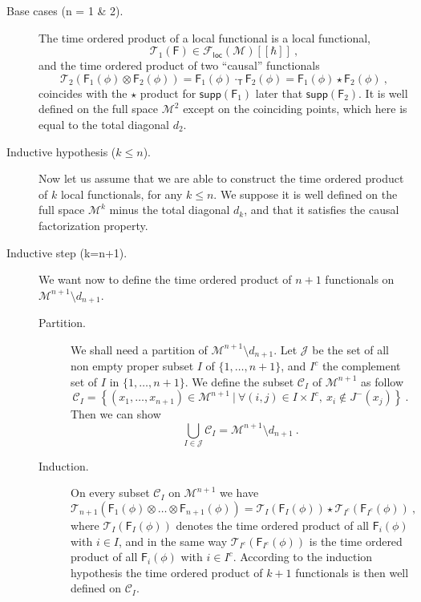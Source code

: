 \documentclass[11pt]{book}
\newcommand{\supp}{\mathsf{supp}}
\newcommand{\loc}{\mathsf{loc}}
\newcommand{\Ccal}{\mathcal{C}}
\newcommand{\Fcal}{\mathcal{F}}
\newcommand{\Jcal}{\mathcal{J}}
\newcommand{\Mcal}{\mathcal{M}}
\newcommand{\Tcal}{\mathcal{T}}
\newcommand{\Fsf}{\mathsf{F}}
\newcommand{\Tsf}{\mathsf{T}}
\theoremstyle{break}
\begin{document}
\begin{description}


\item[Base cases (n = 1 \& 2).] The time ordered product of a local functional is a local functional,
\begin{equation*}
\Tcal_1(\Fsf) \in \Fcal_\loc(\Mcal)[[\hbar]] \ , 
\end{equation*}
%
and the time ordered product of two ``causal'' functionals 
%
\begin{equation*}
\Tcal_2\left(\Fsf_1(\phi)\otimes\Fsf_2(\phi)\right) = \Fsf_1(\phi) \cdot_\Tsf \Fsf_2(\phi) = \Fsf_1(\phi) \star \Fsf_2(\phi) \ ,
\end{equation*}
%
coincides with the $\star$ product for $\supp(\Fsf_1)$ later that $\supp(\Fsf_2)$. It is well defined on the full space $\Mcal^2$ except on the coinciding points, which here is equal to the total diagonal $d_2$.


\item[Inductive hypothesis ($k\leq n$).] Now let us assume that we are able to construct the time ordered product of $k$ local functionals, for any $k \leq n$. We suppose it is well defined on the full space $\Mcal^k$ minus the total diagonal $d_k$, and that it satisfies the causal factorization property. 


\item[Inductive step (k=n+1).] We want now to define the time ordered product of $n+1$ functionals on $\Mcal^{n+1}\setminus d_{n+1}$.


\begin{description}


\item[Partition.] We shall need a partition of $\Mcal^{n+1}\setminus d_{n+1}$. Let $\Jcal$ be the set of all non empty proper subset $I$ of $\{1,\dots,n+1\}$, and $I^c$ the complement set of $I$ in $\{1,\dots,n+1\}$. We define the subset $\Ccal_I$ of $\Mcal^{n+1}$ as follow
%
\begin{equation*}
\Ccal_I = \left\{ (x_1,\dots,x_{n+1}) \in \Mcal^{n+1} \ | \ \forall (i,j) \in I \times I^c , \ x_i \notin J^-(x_j) \right\} \ .
\end{equation*}
%
Then we can show \cite[lemma 4.1]{brunetti_microlocal_2000}
%
\begin{equation*}
\bigcup_{I \in \Jcal} \Ccal_I = \Mcal^{n+1} \setminus d_{n+1} \ .
\end{equation*}


\item[Induction.] On every subset $\Ccal_I$ on $\Mcal^{n+1}$ we have 
%
\begin{equation*}
\Tcal_{n+1}\left(\Fsf_1(\phi) \otimes \dots \otimes \Fsf_{n+1}(\phi) \right) = \Tcal_{I}\left(\Fsf_I(\phi)\right) \star \Tcal_{I^c}\left(\Fsf_{I^c}(\phi)\right) \ , 
\end{equation*}
%
where $\Tcal_{I}\left(\Fsf_I(\phi)\right)$ denotes the time ordered product of all $\Fsf_i(\phi)$ with $i \in I$, and in the same way $\Tcal_{I^c}\left(\Fsf_{I^c}(\phi)\right)$ is the time ordered product of all $\Fsf_i(\phi)$ with $i \in I^c$. According to the induction hypothesis the time ordered product of $k+1$ functionals is then well defined on $\Ccal_I$. 



\end{description}
\end{description}
\end{document}
